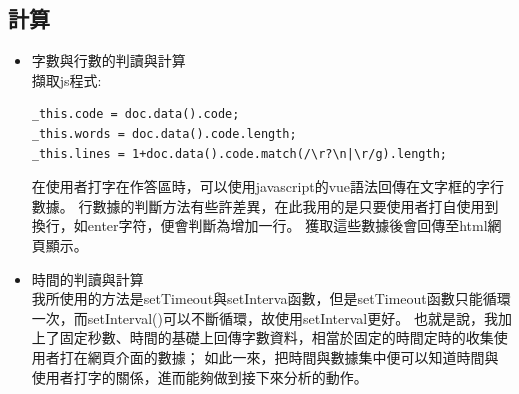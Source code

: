 \subsection{計算}
\begin{itemize}
	\item 字數與行數的判讀與計算\\
	擷取js程式:

\begin{lstlisting}[caption=js字數與行數的判讀與計算]
_this.code = doc.data().code;
_this.words = doc.data().code.length;
_this.lines = 1+doc.data().code.match(/\r?\n|\r/g).length;
\end{lstlisting}

在使用者打字在作答區時，可以使用javascript的vue語法回傳在文字框的字行數據。
行數據的判斷方法有些許差異，在此我用的是只要使用者打自使用到換行，如enter字符，便會判斷為增加一行。
獲取這些數據後會回傳至html網頁顯示。
\item 時間的判讀與計算\\
我所使用的方法是setTimeout與setInterva函數，但是setTimeout函數只能循環一次，而setInterval()可以不斷循環，故使用setInterval更好。\cite{name20}
也就是說，我加上了固定秒數、時間的基礎上回傳字數資料，相當於固定的時間定時的收集使用者打在網頁介面的數據；
如此一來，把時間與數據集中便可以知道時間與使用者打字的關係，進而能夠做到接下來分析的動作。
\end{itemize}

